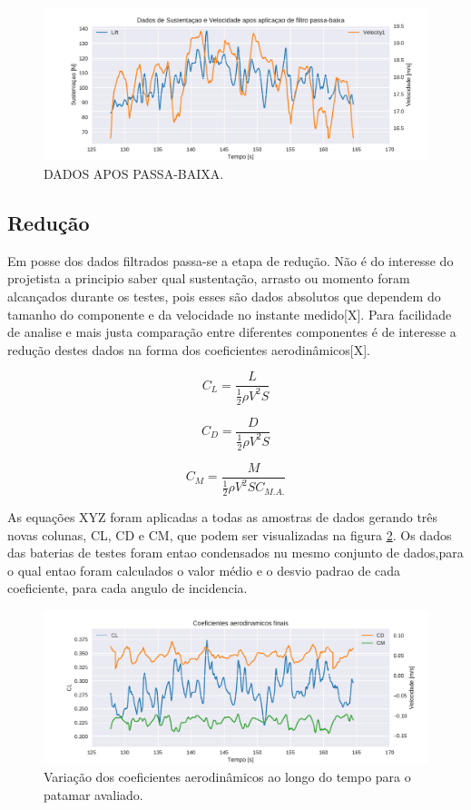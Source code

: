 \begin{figure}[!ht]
    \centering
    \includegraphics[width=.8\linewidth]{plots/filtered_lift_plot.pdf}
    \caption{DADOS APOS PASSA-BAIXA\cite{autor}.}
    \label{fig:filtered_lift_plot}
\end{figure}

\subsection{Redução}

Em posse dos dados filtrados passa-se a etapa de redução. Não é do interesse do projetista a principio saber qual sustentação, arrasto ou momento foram alcançados durante os testes, pois esses são dados absolutos que dependem do tamanho do componente e da velocidade no instante medido[X]. Para facilidade de analise e mais justa comparação entre diferentes componentes é de interesse a redução destes dados na forma dos coeficientes aerodinâmicos[X].

\begin{equation}
    C_L =  \frac{L}{ \frac{1}{2} \rho V^{2} S} 
\end{equation}

\begin{equation} 
    C_D =  \frac{D}{ \frac{1}{2} \rho V^{2} S}
\end{equation}

\begin{equation}
    C_M =  \frac{M}{ \frac{1}{2} \rho V^{2} S C_{M.A.}} 
\end{equation}

As equações XYZ foram aplicadas a todas as amostras de dados gerando três novas colunas, CL, CD e CM, que podem ser visualizadas na figura \ref{fig:coefficients_plot}. Os dados das baterias de testes foram entao condensados nu mesmo conjunto de dados,para o qual entao foram calculados o valor médio e o desvio padrao de cada coeficiente, para cada angulo de incidencia.

\begin{figure}[!ht]
    \centering
    \includegraphics[width=.8\linewidth]{plots/coefficients_plot.pdf}
    \caption{Variação dos coeficientes aerodinâmicos ao longo do tempo para o patamar avaliado\cite{autor}.}
    \label{fig:coefficients_plot}
\end{figure}

